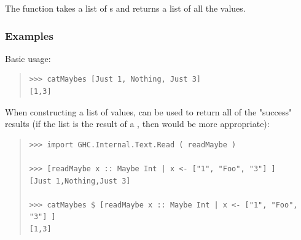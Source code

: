\begin{haddockdesc}
\item[\begin{tabular}{@{}l}
catMaybes :: {\char 91}Maybe a{\char 93} -> {\char 91}a{\char 93}
\end{tabular}]
{\haddockbegindoc
The  function takes a list of s and returns
 a list of all the  values.\par
\subsubsection*{\textbf{Examples}}
Basic usage:\par
\begin{quote}
{\haddockverb\begin{verbatim}
>>> catMaybes [Just 1, Nothing, Just 3]
[1,3]

\end{verbatim}}
\end{quote}
When constructing a list of  values,  can be used
 to return all of the "success" results (if the list is the result
 of a , then  would be more appropriate):\par
\begin{quote}
{\haddockverb\begin{verbatim}
>>> import GHC.Internal.Text.Read ( readMaybe )

>>> [readMaybe x :: Maybe Int | x <- ["1", "Foo", "3"] ]
[Just 1,Nothing,Just 3]

>>> catMaybes $ [readMaybe x :: Maybe Int | x <- ["1", "Foo", "3"] ]
[1,3]

\end{verbatim}}
\end{quote}}
\end{haddockdesc}
